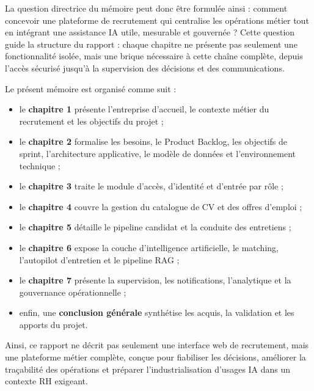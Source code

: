 La question directrice du mémoire peut donc être formulée ainsi : comment concevoir une plateforme de recrutement qui centralise les opérations métier tout en intégrant une assistance IA utile, mesurable et gouvernée ? Cette question guide la structure du rapport : chaque chapitre ne présente pas seulement une fonctionnalité isolée, mais une brique nécessaire à cette chaîne complète, depuis l'accès sécurisé jusqu'à la supervision des décisions et des communications.

Le présent mémoire est organisé comme suit :
\begin{itemize}
  \item le \textbf{chapitre 1} présente l'entreprise d'accueil, le contexte métier du recrutement et les objectifs du projet ;
  \item le \textbf{chapitre 2} formalise les besoins, le Product Backlog, les objectifs de sprint, l'architecture applicative, le modèle de données et l'environnement technique ;
  \item le \textbf{chapitre 3} traite le module d'accès, d'identité et d'entrée par rôle ;
  \item le \textbf{chapitre 4} couvre la gestion du catalogue de CV et des offres d'emploi ;
  \item le \textbf{chapitre 5} détaille le pipeline candidat et la conduite des entretiens ;
  \item le \textbf{chapitre 6} expose la couche d'intelligence artificielle, le matching, l'autopilot d'entretien et le pipeline RAG ;
  \item le \textbf{chapitre 7} présente la supervision, les notifications, l'analytique et la gouvernance opérationnelle ;
  \item enfin, une \textbf{conclusion générale} synthétise les acquis, la validation et les apports du projet.
\end{itemize}

Ainsi, ce rapport ne décrit pas seulement une interface web de recrutement, mais une plateforme métier complète, conçue pour fiabiliser les décisions, améliorer la traçabilité des opérations et préparer l'industrialisation d'usages IA dans un contexte RH exigeant.
